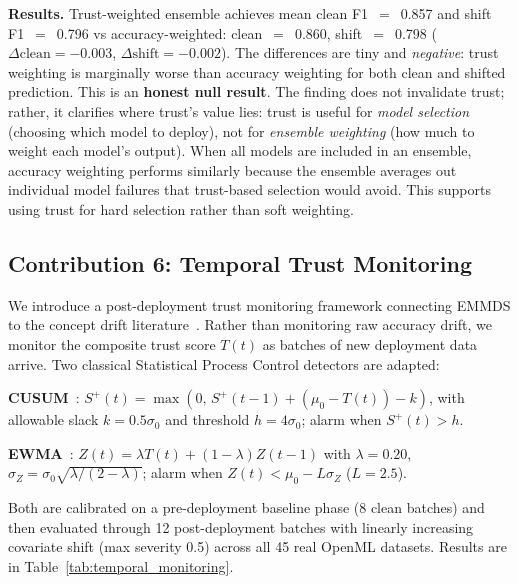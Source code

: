 \documentclass[10pt]{article}
\begin{document}
\textbf{Results.} Trust-weighted ensemble achieves mean clean F1~$=$~0.857 and shift F1~$=$~0.796 vs accuracy-weighted: clean~$=$~0.860, shift~$=$~0.798 ($\Delta\text{clean}{=}{-}0.003$, $\Delta\text{shift}{=}{-}0.002$). The differences are tiny and \emph{negative}: trust weighting is marginally worse than accuracy weighting for both clean and shifted prediction. This is an \textbf{honest null result}. The finding does not invalidate trust; rather, it clarifies where trust's value lies: trust is useful for \emph{model selection} (choosing which model to deploy), not for \emph{ensemble weighting} (how much to weight each model's output). When all models are included in an ensemble, accuracy weighting performs similarly because the ensemble averages out individual model failures that trust-based selection would avoid. This supports using trust for hard selection rather than soft weighting.

\subsection{Contribution 6: Temporal Trust Monitoring}
\label{sec:temporal_new}

We introduce a post-deployment trust monitoring framework connecting EMMDS to the concept drift literature~\citep{gama2014survey}. Rather than monitoring raw accuracy drift, we monitor the composite trust score $T(t)$ as batches of new deployment data arrive. Two classical Statistical Process Control detectors are adapted:

\textbf{CUSUM}~\citep{page1954continuous}: $S^+(t) = \max(0,\, S^+(t{-}1) + (\mu_0 - T(t)) - k)$, with allowable slack $k{=}0.5\sigma_0$ and threshold $h{=}4\sigma_0$; alarm when $S^+(t) > h$.

\textbf{EWMA}~\citep{roberts1959control}: $Z(t) = \lambda T(t) + (1{-}\lambda)Z(t{-}1)$ with $\lambda{=}0.20$, $\sigma_Z {=} \sigma_0\sqrt{\lambda/(2{-}\lambda)}$; alarm when $Z(t) < \mu_0 - L\sigma_Z$ ($L{=}2.5$).

Both are calibrated on a pre-deployment baseline phase (8 clean batches) and then evaluated through 12 post-deployment batches with linearly increasing covariate shift (max severity 0.5) across all 45 real OpenML datasets. Results are in Table~\ref{tab:temporal_monitoring}.
\end{document}
